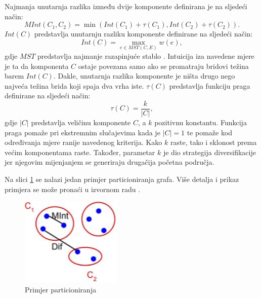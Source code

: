 \documentclass[times, utf8, diplomski]{fer}
\begin{document}
Najmanja unutarnja razlika između dvije komponente definirana je na sljedeći način:
\begin{equation}
    MInt(C_1,C_2) = \min(Int(C_1) + \tau(C_1), Int(C_2) + \tau(C_2)).
\end{equation}
$Int(C)$ predstavlja unutarnju razliku komponente definirane na sljedeći način:
\begin{equation}
    Int(C) = \max_{e \in MST(C,E)} w(e),
\end{equation}
gdje $MST$ predstavlja najmanje razapinjuće stablo .
Intuicija iza navedene mjere je ta da komponenta $C$ ostaje povezana samo ako se promatraju bridovi težina barem $Int(C)$. Dakle, unutarnja razlika komponente je ništa drugo nego najveća težina brida koji spaja dva vrha iste. $\tau(C)$ predstavlja funkciju praga  definirane na sljedeći način:
\begin{equation}
    \tau(C) = \frac{k}{|C|},
\end{equation}
gdje $|C|$ predstavlja veličinu komponente $C$, a $k$ pozitivnu konstantu. Funkcija praga pomaže pri ekstremnim slučajevima kada je $|C| = 1$ te pomaže kod određivanja mjere ranije navedenog kriterija. Kako $k$ raste, tako i sklonost prema većim komponentama raste. Također, parametar $k$ je dio strategija diversifikacije jer njegovim mijenjanjem se generiraju drugačija početna područja.

Na slici \ref{fig:partitioning} se nalazi jedan primjer particioniranja grafa. Više detalja i prikaz primjera se može pronaći u izvornom radu \citep{Felzenszwalb2004}.
\begin{figure}[H]
    \centering
    \includegraphics[scale=0.8]{figures/detector/felzenszwalb.jpg}
    \caption[Caption for LOF]{Primjer particioniranja\footnotemark}
    \label{fig:partitioning}
\end{figure}
\end{document}
